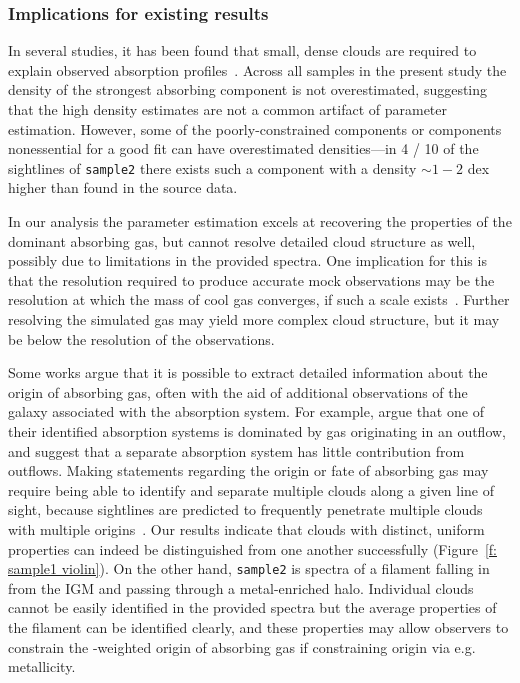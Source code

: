 \documentclass[fleqn,usenatbib]{mnras}
\begin{document}
\subsubsection{Implications for existing results}
\label{s: discussion -- cloud structure -- implications}

In several studies, it has been found that small, dense clouds are required to explain observed absorption profiles~\citep{Rigby2002, Narayanan2008, Muzahid2018}.
Across all samples in the present study the density of the strongest absorbing component is not overestimated,
suggesting that the high density estimates are not a common artifact of parameter estimation.
However, some of the poorly-constrained components or components nonessential for a good fit can have overestimated densities---in 4 / 10 of the sightlines of \texttt{sample2} there exists such a component with a density $\sim 1-2$ dex higher than found in the source data.

In our analysis the parameter estimation excels at recovering the properties of the dominant absorbing gas,
but cannot resolve detailed cloud structure as well,
possibly due to limitations in the provided spectra.
One implication for this is that the resolution required to produce accurate mock observations may be the resolution at which the mass of cool gas converges, if such a scale exists~\citep[e.g.][]{mccourt2018Characteristic}.
Further resolving the simulated gas may yield more complex cloud structure,
but it may be below the resolution of the observations.

Some works argue that it is possible to extract detailed information about the origin of absorbing gas, often with the aid of additional observations of the galaxy associated with the absorption system.
For example, \cite{peroux2013SINFONI} argue that one of their identified absorption systems is dominated by gas originating in an outflow, and \cite{peroux2017Nature} suggest that a separate absorption system has little contribution from outflows.
Making statements regarding the origin or fate of absorbing gas may require being able to identify and separate multiple clouds along a given line of sight,
because sightlines are predicted to frequently penetrate multiple clouds with multiple origins~\citep[e.g.][]{hafen2019Origins, hafen2020Fates}.
Our results indicate that clouds with distinct, uniform properties can indeed be distinguished from one another successfully (Figure~\ref{f: sample1 violin}).
On the other hand, \texttt{sample2} is spectra of a filament falling in from the IGM and passing through a metal-enriched halo.
Individual clouds cannot be easily identified in the provided spectra
but the average properties of the filament can be identified clearly,
and these properties may allow observers to constrain the -weighted origin of absorbing gas if constraining origin via e.g. metallicity.
\end{document}
